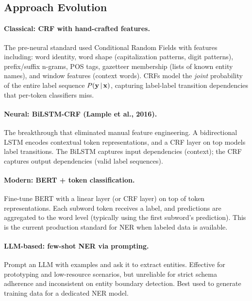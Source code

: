 \subsection{Approach Evolution}
\label{sec:ner_evolution}

\paragraph{Classical: CRF with hand-crafted features.}
The pre-neural standard used Conditional Random Fields with features including: word identity,
word shape (capitalization patterns, digit patterns), prefix/suffix n-grams, POS tags,
gazetteer membership (lists of known entity names), and window features (context words).  CRFs
model the \emph{joint} probability of the entire label sequence $P(\mathbf{y} \,|\, \mathbf{x})$, capturing
label-label transition dependencies that per-token classifiers miss.

\paragraph{Neural: BiLSTM-CRF (Lample et al., 2016).}
The breakthrough that eliminated manual feature engineering.  A bidirectional LSTM encodes
contextual token representations, and a CRF layer on top models label transitions.  The
BiLSTM captures input dependencies (context); the CRF captures output dependencies (valid
label sequences).

\paragraph{Modern: BERT + token classification.}
Fine-tune BERT with a linear layer (or CRF layer) on top of token representations.  Each
subword token receives a label, and predictions are aggregated to the word level (typically
using the first subword's prediction).  This is the current production standard for NER when
labeled data is available.

\paragraph{LLM-based: few-shot NER via prompting.}
Prompt an LLM with examples and ask it to extract entities.  Effective for prototyping and
low-resource scenarios, but unreliable for strict schema adherence and inconsistent on entity
boundary detection.  Best used to generate training data for a dedicated NER model.

